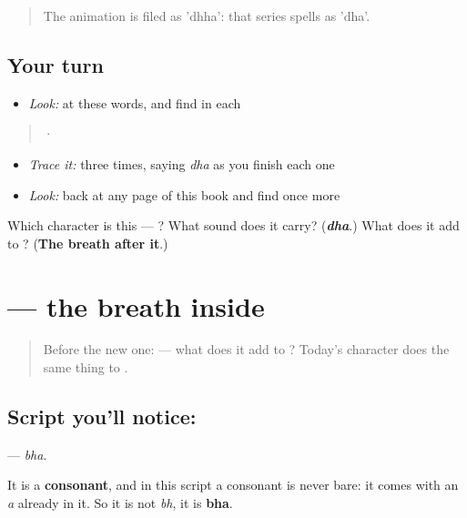 \begin{quote}
The animation is filed as 'dhha': that series spells  as 'dha'.
\end{quote}

\subsection*{Your turn}
\begin{itemize}
\raggedright
  \item \emph{Look:} at these words, and find  in each
\end{itemize}

\begin{quote}
  ·  
\end{quote}

\begin{itemize}
\raggedright
  \item \emph{Trace it:}  three times, saying \emph{dha} as you finish each one
  \item \emph{Look:} back at any page of this book and find  once more
\end{itemize}

\begin{tcolorbox}[breakable,colback=teal!4,colframe=teal!35!black,title={Before you move on}]
Which character is this — ? What sound does it carry? (\emph{\textbf{dha}}.) What does it add to ? (\textbf{The breath after it}.)
\end{tcolorbox}
\section[\texorpdfstring{\kn{ಭ} (bha)}{ಭ (bha)}]{ — the breath inside }

\label{lesson:KA-S168-letter-bha}



\begin{quote}
Before the new one:  — what does it add to ? Today's character does the same thing to .
\end{quote}

\subsection*{Script you'll notice: }
\textbf{} — \emph{bha}.

It is a \textbf{consonant}, and in this script a consonant is never bare: it comes with an \emph{a} already in it. So it is not \emph{bh}, it is \textbf{bha}.

